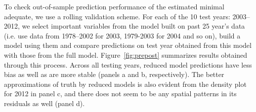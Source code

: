 To check out-of-sample prediction performance of the estimated minimal adequate, we use a rolling validation scheme. For each of the 10 test years: 2003--2012, we select important variables from the model built on past 25 year's data (i.e. use data from 1978--2002 for 2003, 1979-2003 for 2004 and so on), build a model using them and compare predictions on test year obtained from this model with those from the full model. Figure~\ref{fig:prepost} summarizes results obtained through this process. Across all testing years, reduced model predictions have less bias as well as are more stable (panels a and b, respectively). The better approximations of truth by reduced models is also evident from the density plot for 2012 in panel c, and there does not seem to be any spatial patterns in its residuals as well (panel d).
%
